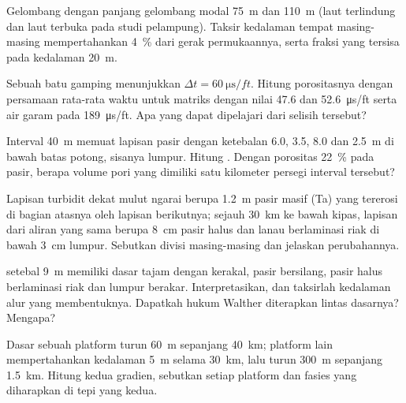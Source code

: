 \begin{exercise}[$\star$]\label{exo:b3:facies-models:4}
Gelombang dengan panjang gelombang modal \qty{75}{m} dan \qty{110}{m} (laut terlindung dan
laut terbuka pada studi pelampung). Taksir kedalaman tempat masing-masing
mempertahankan \qty{4}{\percent} dari gerak permukaannya, serta fraksi yang tersisa
pada kedalaman \qty{20}{m}.
\end{exercise}

\begin{exercise}[$\star\star$]\label{exo:b3:facies-models:5}
Sebuah batu gamping menunjukkan $\Delta t = \qty{60}{\micro\second/ft}$. Hitung
porositasnya dengan persamaan rata-rata waktu untuk matriks dengan nilai 47.6 dan
\qty{52.6}{\micro\second/ft} serta air garam pada \qty{189}{\micro\second/ft}. Apa
yang dapat dipelajari dari selisih tersebut?
\end{exercise}

\begin{exercise}[$\star\star$]\label{exo:b3:facies-models:6}
Interval \qty{40}{m} memuat lapisan pasir dengan ketebalan 6.0, 3.5, 8.0 dan \qty{2.5}{m}
di bawah batas potong, sisanya lumpur. Hitung . Dengan
porositas \qty{22}{\percent} pada pasir, berapa volume pori yang dimiliki satu kilometer
persegi interval tersebut?
\end{exercise}

\begin{exercise}[$\star\star$]\label{exo:b3:facies-models:7}
Lapisan turbidit dekat mulut ngarai berupa \qty{1.2}{m} pasir masif (Ta) yang tererosi di
bagian atasnya oleh lapisan berikutnya; sejauh \qty{30}{km} ke bawah kipas, lapisan
dari aliran yang sama berupa \qty{8}{cm} pasir halus dan lanau berlaminasi riak di bawah
\qty{3}{cm} lumpur. Sebutkan divisi masing-masing dan jelaskan perubahannya.
\end{exercise}

\begin{exercise}[$\star\star$]\label{exo:b3:facies-models:8}
 setebal \qty{9}{m} memiliki dasar tajam dengan kerakal,
pasir bersilang, pasir halus berlaminasi riak dan lumpur berakar. Interpretasikan, dan
taksirlah kedalaman alur yang membentuknya. Dapatkah hukum Walther
diterapkan lintas dasarnya? Mengapa?
\end{exercise}

\begin{exercise}[$\star\star$]\label{exo:b3:facies-models:9}
Dasar sebuah platform turun \qty{60}{m} sepanjang \qty{40}{km}; platform lain
mempertahankan kedalaman \qty{5}{m} selama \qty{30}{km}, lalu turun \qty{300}{m} sepanjang
\qty{1.5}{km}. Hitung kedua gradien, sebutkan setiap platform dan fasies yang
diharapkan di tepi yang kedua.
\end{exercise}

